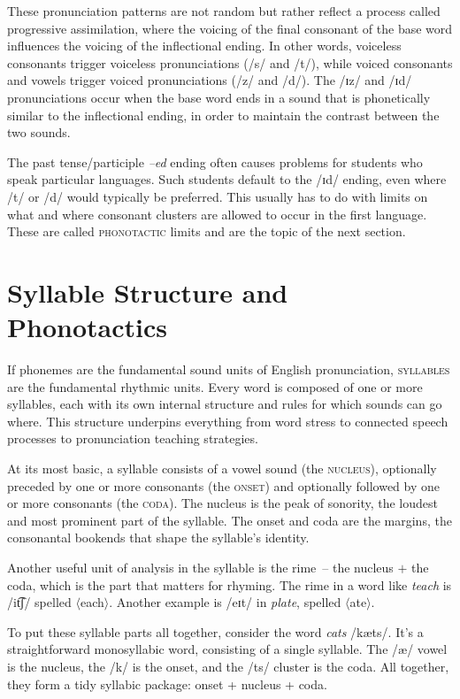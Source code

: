 These pronunciation patterns are not random but rather reflect a process called progressive assimilation, where the voicing of the final consonant of the base word influences the voicing of the inflectional ending. In other words, voiceless consonants trigger voiceless pronunciations (/s/ and /t/), while voiced consonants and vowels trigger voiced pronunciations (/z/ and /d/). The /ɪz/ and /ɪd/ pronunciations occur when the base word ends in a sound that is phonetically similar to the inflectional ending, in order to maintain the contrast between the two sounds.

The past tense/participle \textit{--ed} ending often causes problems for students who speak particular languages. Such students default to the /ɪd/ ending, even where /t/ or /d/ would typically be preferred. This usually has to do with limits on what and where consonant clusters are allowed to occur in the first language. These are called \textsc{phonotactic} limits and are the topic of the next section.

\section{Syllable Structure and Phonotactics} \label{sec:phonotactics}

If phonemes are the fundamental sound units of English pronunciation, \textsc{syllables} are the fundamental rhythmic units. Every word is composed of one or more syllables, each with its own internal structure and rules for which sounds can go where. This structure underpins everything from word stress to connected speech processes to pronunciation teaching strategies.

At its most basic, a syllable consists of a vowel sound (the \textsc{nucleus}), optionally preceded by one or more consonants (the \textsc{onset}) and optionally followed by one or more consonants (the \textsc{coda}). The nucleus is the peak of sonority, the loudest and most prominent part of the syllable. The onset and coda are the margins, the consonantal bookends that shape the syllable's identity.

Another useful unit of analysis in the syllable is the rime~-- the nucleus $+$ the coda, which is the part that matters for rhyming. The rime in a word like \textit{teach} is /it͡ʃ/ spelled $\langle$each$\rangle$. Another example is /eɪt/ in \textit{plate}, spelled $\langle$ate$\rangle$.

To put these syllable parts all together, consider the word \textit{cats} /kæts/. It's a straightforward monosyllabic word, consisting of a single syllable. The /æ/ vowel is the nucleus, the /k/ is the onset, and the /ts/ cluster is the coda. All together, they form a tidy syllabic package: onset + nucleus + coda.

